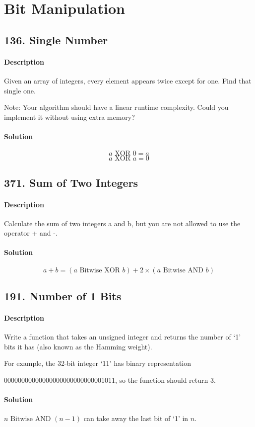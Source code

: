 \section{Bit Manipulation}

\subsection{136. Single Number}

\paragraph{\color{white} \colorbox{Mahogany}{Description}}
Given an array of integers, every element appears twice except for one. Find that single one.

Note:
Your algorithm should have a linear runtime complexity. Could you implement it without using extra memory?

\paragraph{\color{white} \colorbox{OliveGreen}{Solution}}
$$a\text{ XOR }0 = a$$
$$a\text{ XOR }a = 0$$

\subsection{371. Sum of Two Integers}

\paragraph{\color{white} \colorbox{Mahogany}{Description}}
Calculate the sum of two integers a and b, but you are not allowed to use the operator + and -.

\paragraph{\color{white} \colorbox{OliveGreen}{Solution}}
$$a+b=(a\text{ Bitwise XOR }b) + 2\times(a\text{ Bitwise AND }b)$$

\subsection{191. Number of 1 Bits}

\paragraph{\color{white} \colorbox{Mahogany}{Description}}
Write a function that takes an unsigned integer and returns the number of `1' bits it has (also known as the Hamming weight).

For example, the 32-bit integer `11' has binary representation

00000000000000000000000000001011, so the function should return 3.

\paragraph{\color{white} \colorbox{OliveGreen}{Solution}}
$n\text{ Bitwise AND }(n-1)$ can take away the last bit of `1' in $n$.
